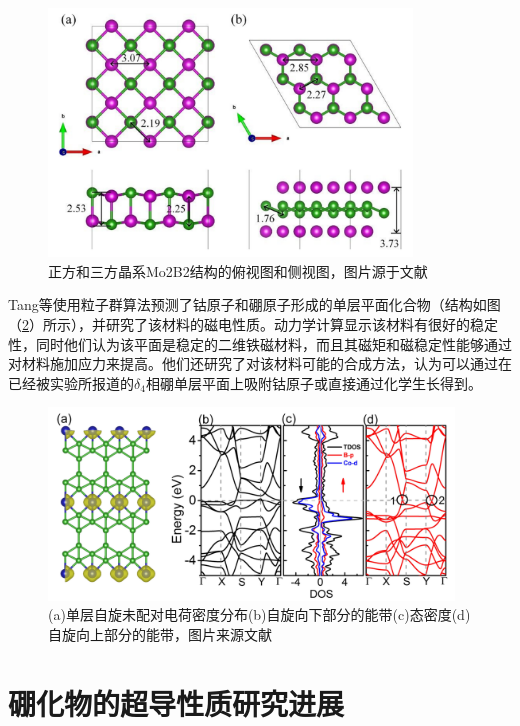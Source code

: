 \begin{figure}
  \includegraphics[width=0.86\textwidth]{figs/ch1_mo2b2.png}
  \centering
  \caption{正方和三方晶系Mo2B2结构的俯视图和侧视图，图片源于文献\cite{bo2019tetragonal}}
  \label{fig:ch1_mo2b2}
\end{figure}

Tang等\cite{tang2019cob}使用粒子群算法预测了钴原子和硼原子形成的单层平面化合物（结构如图（\ref{fig:ch1_cob6}）所示），并研究了该材料的磁电性质。动力学计算显示该材料有很好的稳定性，同时他们认为该平面是稳定的二维铁磁材料，而且其磁矩和磁稳定性能够通过对材料施加应力来提高。他们还研究了对该材料可能的合成方法，认为可以通过在已经被实验所报道的$\delta_4$相硼单层平面上吸附钴原子或直接通过化学生长得到。

\begin{figure}
  \includegraphics[width=0.96\textwidth]{figs/ch1_cob6.png}
  \centering
  \caption{(a)单层自旋未配对电荷密度分布(b)自旋向下部分的能带(c)态密度(d)自旋向上部分的能带，图片来源文献\cite{tang2019cob}}
  \label{fig:ch1_cob6}
\end{figure}

\section{硼化物的超导性质研究进展}

